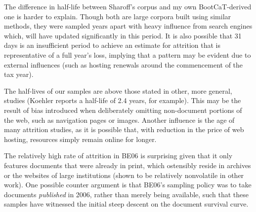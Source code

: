 The difference in half-life between Sharoff's corpus and my own BootCaT-derived one is harder to explain.  Though both are large corpora built using similar methods, they were sampled years apart with heavy influence from search engines which, will have updated significantly in this period.  It is also possible that 31 days is an insufficient period to achieve an estimate for attrition that is representative of a full year's loss, implying that a pattern may be evident due to external influences (such as hosting renewals around the commencement of the tax year).%


The half-lives of our samples are above those stated in other, more general, studies (Koehler reports a half-life of 2.4 years, for example).
This may be the result of bias introduced when deliberately omitting non-document portions of the web, such as navigation pages or images.  Another influence is the age of many attrition studies, as it is possible that, with reduction in the price of web hosting, resources simply remain online for longer.


The relatively high rate of attrition in BE06 is surprising given that it only features documents that were already in print, which ostensibly reside in archives or the websites of large institutions (shown to be relatively nonvolatile in other work).  One possible counter argument is that BE06's sampling policy was to take documents \textsl{published} in 2006, rather than merely being available, such that these samples have witnessed the initial steep descent on the document survival curve. %


